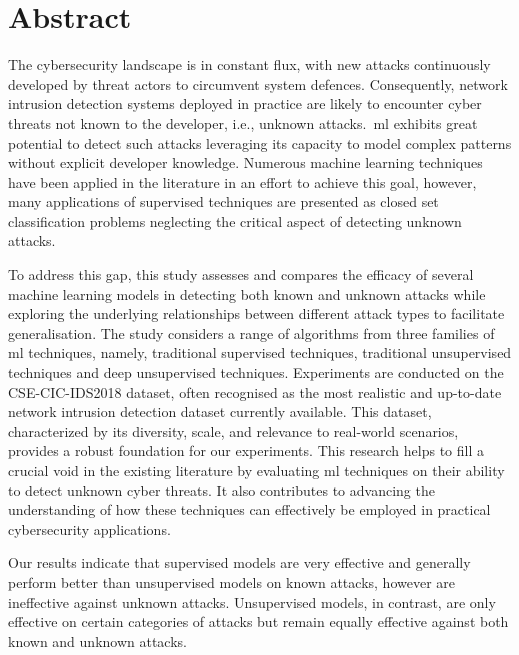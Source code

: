 \chapter*{Abstract}

The cybersecurity landscape is in constant flux, with new attacks continuously
developed by threat actors to circumvent system defences. Consequently, network
intrusion detection systems deployed in practice are likely to encounter cyber
threats not known to the developer, i.e., unknown attacks.\ \gls{ml} exhibits
great potential to detect such attacks leveraging its capacity to model complex
patterns without explicit developer knowledge. Numerous machine learning
techniques have been applied in the literature in an effort to achieve this
goal, however, many applications of supervised techniques are presented as
closed set classification problems neglecting the critical aspect of detecting
unknown attacks.

To address this gap, this study assesses and compares the efficacy of several
machine learning models in detecting both known and unknown attacks while
exploring the underlying relationships between different attack types to
facilitate generalisation. The study considers a range of algorithms from three
families of \gls{ml} techniques, namely, traditional supervised techniques,
traditional unsupervised techniques and deep unsupervised techniques.
Experiments are conducted on the CSE-CIC-IDS2018 dataset, often recognised as
the most realistic and up-to-date network intrusion detection dataset currently
available. This dataset, characterized by its diversity, scale, and relevance
to real-world scenarios, provides a robust foundation for our experiments. This
research helps to fill a crucial void in the existing literature by evaluating
\gls{ml} techniques on their ability to detect unknown cyber threats. It also
contributes to advancing the understanding of how these techniques can
effectively be employed in practical cybersecurity applications.

Our results indicate that supervised models are very effective and generally
perform better than unsupervised models on known attacks, however are
ineffective against unknown attacks. Unsupervised models, in contrast, are only
effective on certain categories of attacks but remain equally effective against
both known and unknown attacks.
